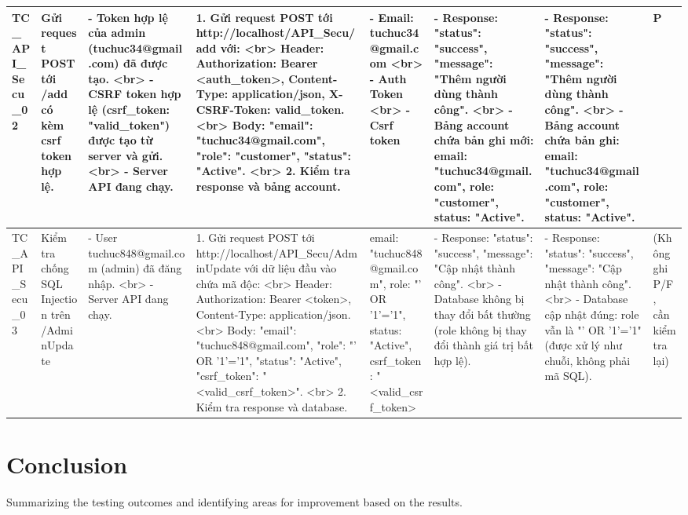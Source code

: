 \documentclass[a4paper,12pt]{article}
\begin{document}
\begin{longtable}{|p{2cm}|p{3cm}|p{3cm}|p{4cm}|p{3cm}|p{3cm}|p{3cm}|p{2cm}|}
    TC_API_Secu_02 & Gửi request POST tới /add có kèm csrf token hợp lệ. & - Token hợp lệ của admin (tuchuc34@gmail.com) đã được tạo. <br> - CSRF token hợp lệ (csrf_token: "valid_token") được tạo từ server và gửi. <br> - Server API đang chạy. & 1. Gửi request POST tới http://localhost/API_Secu/add với: <br> Header: Authorization: Bearer <auth_token>, Content-Type: application/json, X-CSRF-Token: valid_token. <br> Body: {"email": "tuchuc34@gmail.com", "role": "customer", "status": "Active"}. <br> 2. Kiểm tra response và bảng account. & - Email: tuchuc34@gmail.com <br> - Auth Token <br> - Csrf token & - Response: {"status": "success", "message": "Thêm người dùng thành công"}. <br> - Bảng account chứa bản ghi mới: email: "tuchuc34@gmail.com", role: "customer", status: "Active". & - Response: {"status": "success", "message": "Thêm người dùng thành công"}. <br> - Bảng account chứa bản ghi: email: "tuchuc34@gmail.com", role: "customer", status: "Active". & P \\ \hline
    TC_API_Secu_03 & Kiểm tra chống SQL Injection trên /AdminUpdate & - User tuchuc848@gmail.com (admin) đã đăng nhập. <br> - Server API đang chạy. & 1. Gửi request POST tới http://localhost/API_Secu/AdminUpdate với dữ liệu đầu vào chứa mã độc: <br> Header: Authorization: Bearer <token>, Content-Type: application/json. <br> Body: {"email": "tuchuc848@gmail.com", "role": "' OR '1'='1", "status": "Active", "csrf_token": "<valid_csrf_token>"}. <br> 2. Kiểm tra response và database. & email: "tuchuc848@gmail.com", role: "' OR '1'='1", status: "Active", csrf_token: "<valid_csrf_token> & - Response: {"status": "success", "message": "Cập nhật thành công"}. <br> - Database không bị thay đổi bất thường (role không bị thay đổi thành giá trị bất hợp lệ). & - Response: {"status": "success", "message": "Cập nhật thành công"}. <br> - Database cập nhật đúng: role vẫn là "' OR '1'='1" (được xử lý như chuỗi, không phải mã SQL). & (Không ghi P/F, cần kiểm tra lại) \\ \hline
\end{longtable}

\section{Conclusion}
Summarizing the testing outcomes and identifying areas for improvement based on the results.
\end{document}
